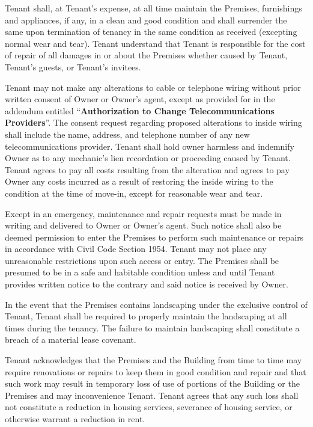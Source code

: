 \documentclass[9pt, letterpaper, oneside]{extarticle}
\newcounter{para}
\newcommand\numparagraph{\par\refstepcounter{para}\textbf{\thepara}\hspace{5mm}}
\begin{document}
 \numparagraph{\textbf{MAINTENANCE AND REPAIRS:}\hspace{2mm}} Tenant shall, at Tenant's expense, at all time maintain the Premises, furnishings and appliances, if any, in a clean and good condition and shall surrender the same upon termination of tenancy in the same condition as received (excepting normal wear and tear). Tenant understand that Tenant is responsible for the cost of repair of all damages in or about the Premises whether caused by Tenant, Tenant's guests, or Tenant's invitees.
 
 Tenant may not make any alterations to cable or telephone wiring without prior written consent of Owner or Owner's agent, except as provided for in the addendum entitled ``\textbf{Authorization to Change Telecommunications Providers}''. The consent request regarding proposed alterations to inside wiring shall include the name, address, and telephone number of any new telecommunications provider. Tenant shall hold owner harmless and indemnify Owner as to any mechanic's lien recordation or proceeding caused by Tenant. Tenant agrees to pay all costs resulting from the alteration and agrees to pay Owner any costs incurred as a result of restoring the inside wiring to the condition at the time of move-in, except for reasonable wear and tear.

 Except in an emergency, maintenance and repair requests must be made in writing and delivered to Owner or Owner's agent. Such notice shall also be deemed permission to enter the Premises to perform such maintenance or repairs in accordance with Civil Code Section 1954. Tenant may not place any unreasonable restrictions upon such access or entry. The Premises shall be presumed to be in a safe and habitable condition unless and until Tenant provides written notice to the contrary and said notice is received by Owner.

 In the event that the Premises contains landscaping under the exclusive control of Tenant, Tenant shall be required to properly maintain the landscaping at all times during the tenancy. The failure to maintain landscaping shall constitute a breach of a material lease covenant.

 Tenant acknowledges that the Premises and the Building from time to time may require renovations or repairs to keep them in good condition and repair and that such work may result in temporary loss of use of portions of the Building or the Premises and may inconvenience Tenant. Tenant agrees that any such loss shall not constitute a reduction in housing services, severance of housing service, or otherwise warrant a reduction in rent.
\end{document}
